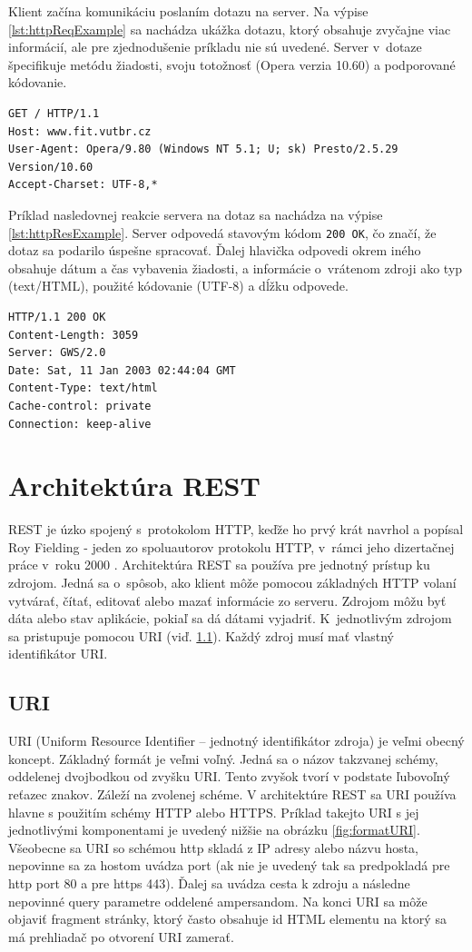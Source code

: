 \documentclass[slovak]{fitthesis}
\begin{document}
Klient začína komunikáciu poslaním dotazu na server. Na výpise \ref{lst:httpReqExample} sa nachádza ukážka dotazu, ktorý obsahuje zvyčajne viac informácií, ale pre zjednodušenie príkladu nie sú uvedené. Server v~dotaze špecifikuje metódu žiadosti, svoju totožnosť (Opera verzia 10.60) a podporované kódovanie.
\begin{lstlisting}[caption=príklad HTTP dotazu,frame=tlrb,label={lst:httpReqExample}]
GET / HTTP/1.1
Host: www.fit.vutbr.cz
User-Agent: Opera/9.80 (Windows NT 5.1; U; sk) Presto/2.5.29 Version/10.60
Accept-Charset: UTF-8,*
\end{lstlisting}
Príklad nasledovnej reakcie servera na dotaz sa nachádza na výpise \ref{lst:httpResExample}. Server odpovedá stavovým kódom \texttt{200 OK}, čo značí, že dotaz sa podarilo úspešne spracovať. Ďalej hlavička odpovedi okrem iného obsahuje dátum a čas vybavenia žiadosti, a informácie o~vrátenom zdroji ako typ (text/HTML), použité kódovanie (UTF-8) a dĺžku odpovede. 
\begin{lstlisting}[caption=príklad HTTP odpovedi,frame=tlrb,label={lst:httpResExample}]
HTTP/1.1 200 OK
Content-Length: 3059
Server: GWS/2.0
Date: Sat, 11 Jan 2003 02:44:04 GMT
Content-Type: text/html
Cache-control: private
Connection: keep-alive
\end{lstlisting}



\section{Architektúra REST}\label{rest}
REST je úzko spojený s~protokolom HTTP, keďže ho prvý krát navrhol a popísal Roy Fielding - jeden zo spoluautorov protokolu HTTP, v~rámci jeho dizertačnej práce v~roku 2000 \cite{dizertackaREST}.
Architektúra REST sa používa pre jednotný prístup ku zdrojom. Jedná sa o~spôsob, ako klient môže pomocou základných HTTP volaní vytvárať, čítať, editovať alebo mazať informácie zo serveru. Zdrojom môžu byť dáta alebo stav aplikácie, pokiaľ sa dá dátami vyjadriť. K~jednotlivým zdrojom sa pristupuje pomocou URI (viď. \ref{URI}). Každý zdroj musí mať vlastný identifikátor URI.

\subsection{URI} \label{URI}
URI (Uniform Resource Identifier – jednotný identifikátor zdroja) je veľmi obecný koncept. Základný formát je veľmi voľný. Jedná sa o názov takzvanej schémy, oddelenej dvojbodkou od zvyšku URI. Tento zvyšok tvorí v podstate ľubovoľný reťazec znakov. Záleží na zvolenej schéme\cite{URIRFC}. V architektúre REST sa URI používa hlavne s použitím schémy HTTP alebo HTTPS. Príklad takejto URI s jej jednotlivými komponentami je uvedený nižšie na obrázku \ref{fig:formatURI}. Všeobecne sa URI so schémou http skladá z IP adresy alebo názvu hosta, nepovinne sa za hostom uvádza port (ak nie je uvedený tak sa predpokladá pre http port 80 a pre https 443). Ďalej sa uvádza cesta k zdroju a následne nepovinné query parametre oddelené ampersandom. Na konci URI sa môže objaviť fragment stránky, ktorý často obsahuje id HTML elementu na ktorý sa má prehliadač po otvorení URI zamerať.
\end{document}
